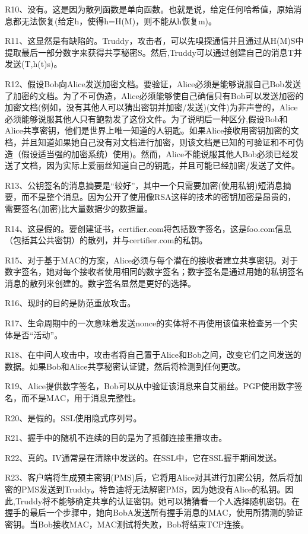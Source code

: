 \documentclass[11pt,UTF8,twoside]{article}
\begin{document}
{		R10、没有。这是因为散列函数是单向函数。也就是说，给定任何哈希值，原始消息都无法恢复(给定h，使得h=H(M)，则不能从h恢复m)。
		
		R11、这显然是有缺陷的。Truddy，攻击者，可以先嗅探通信并且通过从H(M)S中提取最后一部分数字来获得共享秘密S。然后,Truddy可以通过创建自己的消息T并发送(T,h(t)s)。
		
		R12、假设Bob向Alice发送加密文档。要验证，Alice必须是能够说服自己Bob发送了加密的文档。为了不可伪造，Alice必须能够使自己确信只有Bob可以发送加密的加密文档(例如，没有其他人可以猜出密钥并加密/发送)(文件)为非声誉的，Alice必须能够说服其他人只有鲍勃发了这份文件。为了说明后一种区分,假设Bob和Alice共享密钥，他们是世界上唯一知道的人钥匙。如果Alice接收用密钥加密的文档，并且知道如果她自己没有对文档进行加密，则该文档是已知的可验证和不可伪造（假设适当强的加密系统）使用)。然而，Alice不能说服其他人Bob必须已经发送了文档，因为实际上爱丽丝知道自己的钥匙，并且可能已经加密/发送了文件。
		
		R13、公钥签名的消息摘要是“较好”，其中一个只需要加密(使用私钥)短消息摘要，而不是整个消息。因为公开了使用像RSA这样的技术的密钥加密是昂贵的，需要签名(加密)比大量数据少的数据量。
		
		R14、这是假的。要创建证书，certifier.com将包括数字签名，这是foo.com信息（包括其公共密钥）的散列，并与certifier.com的私钥。
		
		R15、对于基于MAC的方案，Alice必须与每个潜在的接收者建立共享密钥。对于数字签名，她对每个接收者使用相同的数字签名；数字签名是通过用她的私钥签名消息的散列来创建的。数字签名显然是更好的选择。
		
		R16、现时的目的是防范重放攻击。
		
		R17、生命周期中的一次意味着发送nonce的实体将不再使用该值来检查另一个实体是否“活动”。
		
		R18、在中间人攻击中，攻击者将自己置于Alice和Bob之间，改变它们之间发送的数据。如果Bob和Alice共享秘密认证键，然后将检测到任何更改。
		
		R19、Alice提供数字签名，Bob可以从中验证该消息来自艾丽丝。PGP使用数字签名，而不是MAC，用于消息完整性。
		
		R20、是假的。SSL使用隐式序列号。
		
		R21、握手中的随机不连续的目的是为了抵御连接重播攻击。
		
		R22、真的。IV通常是在清除中发送的。在SSL中，它在SSL握手期间发送。
		
		R23、客户端将生成预主密钥(PMS)后，它将用Alice对其进行加密公钥，然后将加密的PMS发送到Truddy。特鲁迪将无法解密PMS，因为她没有Alice的私钥。因此,Truddy将不能够确定共享的认证密钥。她可以猜猜看一个人选择随机密钥。在握手的最后一个步骤中，她向BobA发送所有握手消息的MAC，使用所猜测的验证密钥。当Bob接收MAC，MAC测试将失败，Bob将结束TCP连接。
		
}
\end{document}
